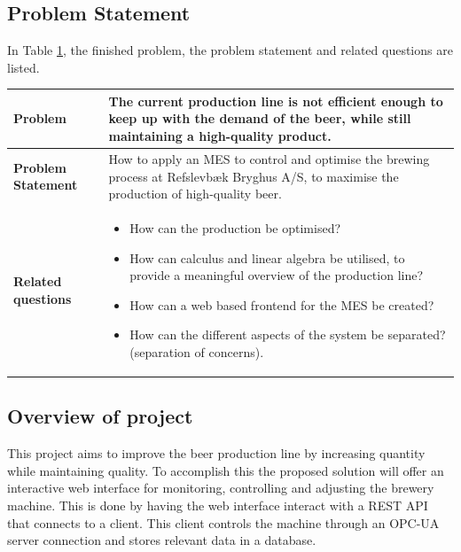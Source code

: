 \subsection{Problem Statement}
In Table \ref{table:problem-statement-report}, the finished problem, the problem statement and related questions are listed.
\begin{table}[ht]
    \begin{tabularx}{\textwidth}{|>{\RaggedRight}p{4cm}|>{\RaggedRight}X|}
        \hline
        \textbf{Problem} & The current production line is not efficient enough to keep up with the demand of the beer, while still maintaining a high-quality product. \\
        \hline
        \textbf{Problem Statement} & How to apply an MES to control and optimise the brewing process at Refslevbæk Bryghus A/S, to maximise the production of high-quality beer. \\
        \hline
        \textbf{Related questions} & 
            \begin{itemize}
                \item How can the production be optimised?
                \item How can calculus and linear algebra be utilised, to provide a meaningful overview of the production line?
                \item How can a web based frontend for the MES be created?
                \item How can the different aspects of the system be separated? (separation of concerns).
            \end{itemize} \\
            \hline
    \end{tabularx}
    \label{table:problem-statement-report}
\end{table} 

\subsection{Overview of project}
This project aims to improve the beer production line by increasing quantity
while maintaining quality. To accomplish this the proposed solution will offer
an interactive web interface for monitoring, controlling and adjusting the
brewery machine. This is done by having the web interface interact with a REST
API that connects to a client. This client controls the machine through an
OPC-UA server connection and stores relevant data in a database.

